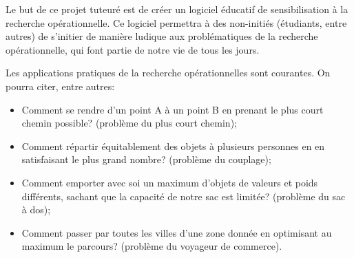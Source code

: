 \setcounter{footnote}{0}

Le but de ce projet tuteuré est de créer un logiciel éducatif de sensibilisation à la recherche
 opérationnelle. Ce logiciel permettra à des non-initiés (étudiants, entre autres) de s'initier
 de manière ludique aux problématiques de la recherche opérationnelle, qui font partie de notre
 vie de tous les jours.

Les applications pratiques de la recherche opérationnelles sont courantes. On pourra citer,
 entre autres:

\begin{itemize}
 \item Comment se rendre d'un point A à un point B en prenant le plus court chemin possible?
  (problème du plus court chemin);
 \item Comment répartir équitablement des objets à plusieurs personnes en en satisfaisant le
  plus grand nombre? (problème du couplage);
 \item Comment emporter avec soi un maximum d'objets de valeurs et poids différents, sachant
  que la capacité de notre sac est limitée? (problème du sac à dos);
 \item Comment passer par toutes les villes d'une zone donnée en optimisant au maximum le
  parcours? (problème du voyageur de commerce).
\end{itemize}

